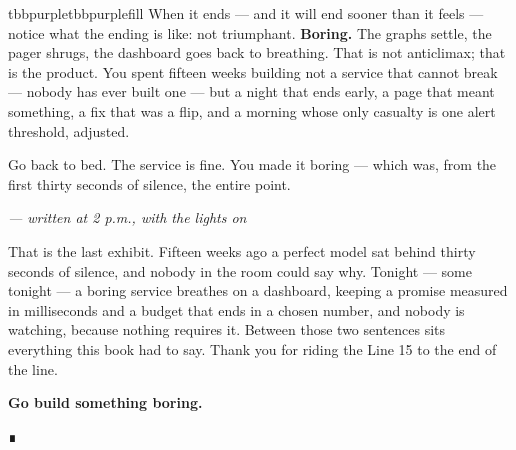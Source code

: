 \begin{calloutbox}{tbbpurple}{tbbpurplefill}
When it ends — and it will end sooner than it feels — notice what the ending is like: not triumphant. \textbf{Boring.} The graphs settle, the pager shrugs, the dashboard goes back to breathing. That is not anticlimax; that is the product. You spent fifteen weeks building not a service that cannot break — nobody has ever built one — but a night that ends early, a page that meant something, a fix that was a flip, and a morning whose only casualty is one alert threshold, adjusted.

Go back to bed. The service is fine. You made it boring — which was, from the first thirty seconds of silence, the entire point.

{\raggedleft \textcolor{tbbgray}{\textit{— written at 2 p.m., with the lights on}}\par}
\end{calloutbox}

\vspace{4.0pt}

That is the last exhibit. Fifteen weeks ago a perfect model sat behind thirty seconds of silence, and nobody in the room could say why. Tonight — some tonight — a boring service breathes on a dashboard, keeping a promise measured in milliseconds and a budget that ends in a chosen number, and nobody is watching, because nothing requires it. Between those two sentences sits everything this book had to say. Thank you for riding the Line 15 to the end of the line.

\begin{center}
{\large \textcolor{tbbink}{\textbf{Go build something boring.}}}
\end{center}

\begin{center}
\textcolor{tbbgray}{∎}
\end{center}
